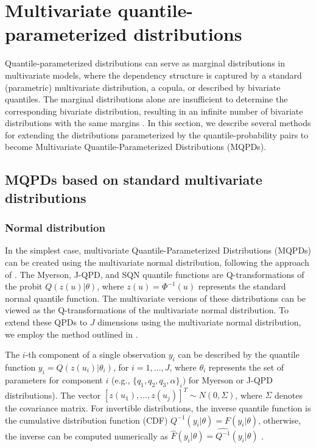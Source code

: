 \documentclass[
  fleqn,
  deca,
  blindrev
]{informs4}
\begin{document}
\section{Multivariate quantile-parameterized
distributions}\label{sec-multivariateqpd}

Quantile-parameterized distributions can serve as marginal distributions
in multivariate models, where the dependency structure is captured by a
standard (parametric) multivariate distribution, a copula, or described
by bivariate quantiles. The marginal distributions alone are
insufficient to determine the corresponding bivariate distribution,
resulting in an infinite number of bivariate distributions with the same
margins
\citep{gumbel1960BivariateExponentialDistributions, gumbel1961BivariateLogisticDistributions}.
In this section, we describe several methods for extending the
distributions parameterized by the quantile-probability pairs to become
Multivariate Quantile-Parameterized Distributions (MQPDs).

\subsection{MQPDs based on standard multivariate
distributions}\label{mqpds-based-on-standard-multivariate-distributions}

\subsubsection{Normal distribution}\label{normal-distribution}

In the simplest case, multivariate Quantile-Parameterized Distributions
(MQPDs) can be created using the multivariate normal distribution,
following the approach of \citet{hoff2007ExtendingRankLikelihood}. The
Myerson, J-QPD, and SQN quantile functions are Q-transformations of the
probit \(Q(z(u)\vert\theta)\), where \(z(u)=\Phi^{-1}(u)\) represents
the standard normal quantile function. The multivariate versions of
these distributions can be viewed as the Q-transformations of the
multivariate normal distribution. To extend these QPDs to \(J\)
dimensions using the multivariate normal distribution, we employ the
method outlined in \citet{drovandi2011LikelihoodfreeBayesianEstimation}.

The \(i\)-th component of a single observation \(y_i\) can be described
by the quantile function \(y_i=Q(z(u_i)\vert\theta_i)\), for
\(i=1,\dots,J\), where \(\theta_i\) represents the set of parameters for
component \(i\) (e.g., \(\{q_1,q_2,q_3, \alpha\}_i)\) for Myerson or
J-QPD distributions). The vector
\([z(u_1),\dots,z(u_j)]^T\sim N(0,\Sigma)\), where \(\Sigma\) denotes
the covariance matrix. For invertible distributions, the inverse
quantile function is the cumulative distribution function (CDF)
\(Q^{-1}(y_i\vert\theta)=F(y_i\vert\theta)\), otherwise, the inverse can
be computed numerically as
\(\widehat{F}(y_i\vert\theta)=\widehat{Q^{-1}}(y_i\vert\theta)\)
\citep{perepolkin2023TenetsQuantilebasedInference}.
\end{document}
